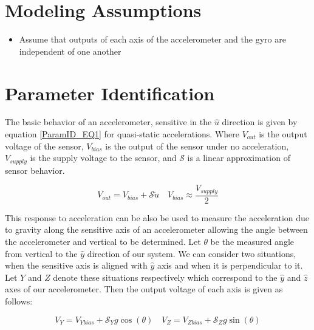 \documentclass{article}
\theoremstyle{plain}
\theoremstyle{definition}
\theoremstyle{remark}
\newcommand{\Sens}{\mathcal{S}}
\begin{document}
\section{Modeling Assumptions}
\begin{itemize}
\item{Assume that outputs of each axis of the accelerometer and the gyro are independent of one another}
\end{itemize}

\section{Parameter Identification}

The basic behavior of an accelerometer, sensitive in the $\hat{u}$ direction is given by equation \ref{ParamID_EQ1} for quasi-static accelerations.  Where $V_{out}$ is the output voltage of the sensor, $V_{bias}$ is the output of the sensor under no acceleration, $V_{supply}$ is the supply voltage to the sensor, and $\Sens$ is a linear approximation of sensor behavior.

\begin{equation}
V_{out} = V_{bias} + \Sens \ddot{u} \quad V_{bias} \approx \frac{V_{supply}}{2}
\label{ParamID_EQ1}
\end{equation}

This response to acceleration can be also be used to measure the acceleration due to gravity along the sensitive axis of an accelerometer allowing the angle between the accelerometer and vertical to be determined.  Let $\theta$ be the measured angle from vertical to the $\hat{y}$ direction of our system.  We can consider two situations, when the sensitive axis is aligned with $\hat{y}$ axis and when it is perpendicular to it.  Let $Y$ and $Z$ denote these situations respectively which correspond to the $\hat{y}$ and $\hat{z}$ axes of our accelerometer.  Then the output voltage of each axis is given as follows:

\begin{equation}
V_{Y} = V_{Ybias} + \Sens_{Y} g \cos(\theta) \quad V_{Z} = V_{Zbias} + \Sens_{Z} g \sin(\theta)
\label{ParamID_EQ2}
\end{equation}
\end{document}
